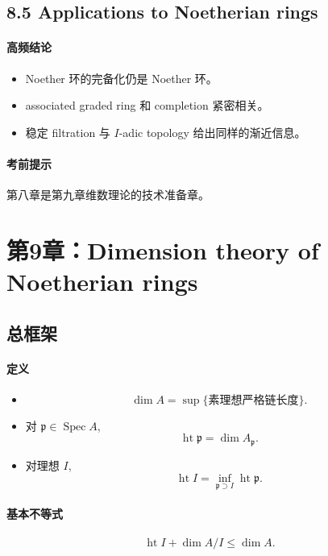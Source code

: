 \documentclass[a4paper]{ctexart}
\begin{document}
\subsection{8.5 Applications to Noetherian rings}

\paragraph{高频结论}
\begin{itemize}
  \item Noether 环的完备化仍是 Noether 环。
  \item associated graded ring 和 completion 紧密相关。
  \item 稳定 filtration 与 \(I\)-adic topology 给出同样的渐近信息。
\end{itemize}

\paragraph{考前提示}
第八章是第九章维数理论的技术准备章。

\section{第9章：Dimension theory of Noetherian rings}

\subsection{总框架}

\paragraph{定义}
\begin{itemize}
  \item
  \[
    \dim A=\sup\{\text{素理想严格链长度}\}.
  \]
  \item 对 \(\mathfrak p\in\operatorname{Spec}A\),
  \[
    \operatorname{ht}\mathfrak p=\dim A_{\mathfrak p}.
  \]
  \item 对理想 \(I\),
  \[
    \operatorname{ht}I=\inf_{\mathfrak p\supset I}\operatorname{ht}\mathfrak p.
  \]
\end{itemize}

\paragraph{基本不等式}
\[
\operatorname{ht}I+\dim A/I\le \dim A.
\]
\end{document}
